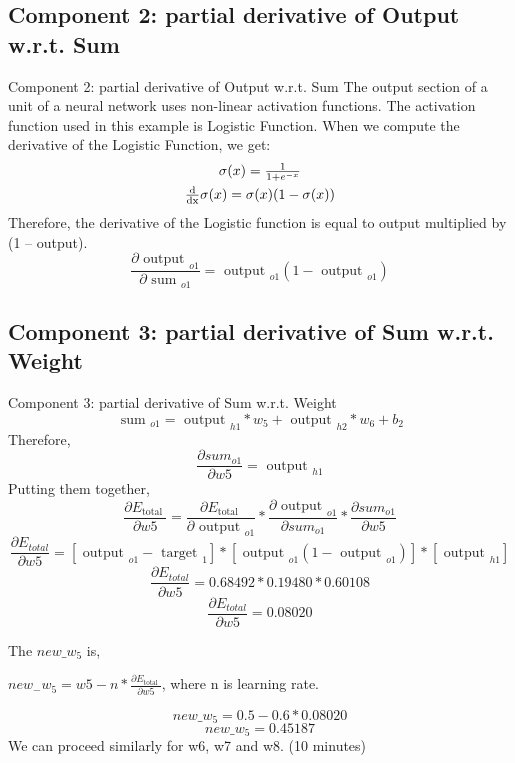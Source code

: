 \documentclass[8pt,dvipsnames]{beamer}
\begin{document}
\subsection{Component 2: partial derivative of Output w.r.t. Sum}
\begin{frame}{Component 2: partial derivative of Output w.r.t. Sum}
	The output section of a unit of a neural network uses non-linear activation functions. The activation function used in this example is Logistic Function. When we compute the derivative of the Logistic Function, we get:
	$$
	\begin{array}{c}\sigma(x)=\frac{1}{1+e^{-x}} \vspace{4pt}\\ \frac{\mathrm{d}}{\mathrm{dx}} \sigma(x)=\sigma(x)(1-\sigma(x))\end{array}
	$$
	Therefore, the derivative of the Logistic function is equal to output multiplied by (1 – output).
	$$
	\frac{\partial\text { output }_{o 1}}{\partial \text { sum }_{o 1}}=\text { output }_{o 1}\left(1-\text { output }_{o 1}\right)
	$$
\end{frame}

\subsection{Component 3: partial derivative of Sum w.r.t. Weight}
\begin{frame}{Component 3: partial derivative of Sum w.r.t. Weight}
	$$
	\text { sum }_{o 1}=\text { output }_{h 1} * w_{5}+\text { output }_{h 2} * w_{6}+b_{2}
	$$
	Therefore, 
	$$
	\frac{\partial s u m_{o 1}}{\partial w 5}=\text { output }_{h 1}
	$$
	Putting them together,
	$$
	\frac{\partial E_{\text {total }}}{\partial w 5}=\frac{\partial E_{\text {total }}}{\partial \text { output }_{o 1}} * \frac{\partial \text { output }_{o 1}}{\partial s u m_{o 1}} * \frac{\partial s u m_{o 1}}{\partial w 5}
	$$
	$$
	\frac{\partial E_{t o t a l}}{\partial w 5}=\left[\text { output }_{o 1}-\text { target }_{1}\right] *\left[\text { output }_{o 1}\left(1-\text { output }_{o 1}\right)\right] *\left[\text { output }_{h 1}\right]
	$$
	$$
	\frac{\partial E_{t o t a l}}{\partial w 5}=0.68492 * 0.19480 * 0.60108
	$$
	$$
	\frac{\partial E_{t o t a l}}{\partial w 5}=0.08020
	$$
\end{frame}

\begin{frame}
	The \(n e w \_w_{5}\) is,
	
	\(n e w_{-} w_{5}=w 5-n * \frac{\partial E_{\text {total }}}{\partial w 5}\), where \(\mathrm{n}\) is learning rate.
	
		$$
		n e w \_w_{5}=0.5-0.6 * 0.08020
		$$
		$$
		n e w \_w_{5}=0.45187
		$$
		We can proceed similarly for w6, w7 and w8. (10 minutes)
\end{frame}
\end{document}
